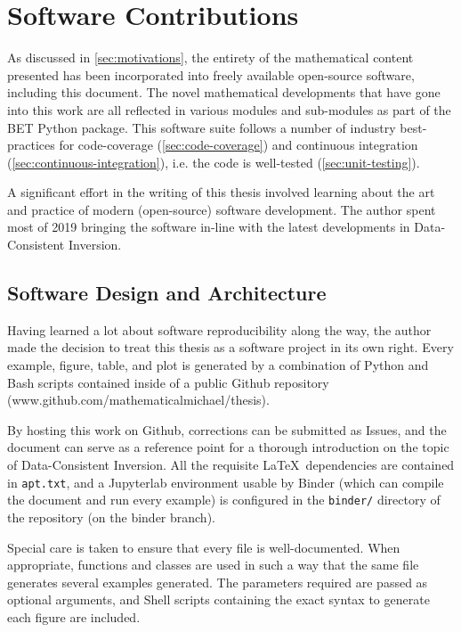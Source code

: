 \section{Software Contributions}\label{sec:software-contributions}

As discussed in \ref{sec:motivations}, the entirety of the mathematical content presented has been incorporated into freely available open-source software, including this document.
The novel mathematical developments that have gone into this work are all reflected in various modules and sub-modules as part of the BET Python package.
This software suite follows a number of industry best-practices for code-coverage (\ref{sec:code-coverage}) and continuous integration (\ref{sec:continuous-integration}), i.e. the code is well-tested (\ref{sec:unit-testing}).

A significant effort in the writing of this thesis involved learning about the art and practice of modern (open-source) software development.
The author spent most of 2019 bringing the software in-line with the latest developments in Data-Consistent Inversion.



\subsection{Software Design and Architecture}\label{sec:architecture}

Having learned a lot about software reproducibility along the way, the author made the decision to treat this thesis as a software project in its own right.
Every example, figure, table, and plot is generated by a combination of Python and Bash scripts contained inside of a public Github repository (www.github.com/mathematicalmichael/thesis).

By hosting this work on Github, corrections can be submitted as Issues, and the document can serve as a reference point for a thorough introduction on the topic of Data-Consistent Inversion.
All the requisite \LaTeX~dependencies are contained in {\tt apt.txt}, and a Jupyterlab environment usable by Binder (which can compile the document and run every example) is configured in the {\tt binder/} directory of the repository (on the binder branch).

Special care is taken to ensure that every file is well-documented.
When appropriate, functions and classes are used in such a way that the same file generates several examples generated.
The parameters required are passed as optional arguments, and Shell scripts containing the exact syntax to generate each figure are included.

